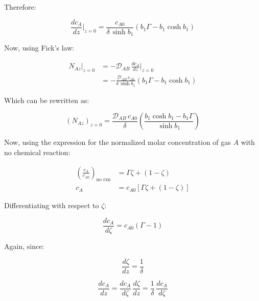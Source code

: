 \documentclass[letterpaper,12pt]{article}
\begin{document}
Therefore:

\begin{equation}
    \frac{dc_A}{dz}\bigg|_{z=0} = \frac{c_{A0}}{\delta\,\sinh b_1}\left(b_1\Gamma - b_1\cosh b_1\right)
\end{equation}

Now, using Fick's law:

\begin{equation}
\begin{aligned}
    N_{Az}\big|_{z=0} &= -\mathcal{D}_{AB}\,\frac{dc_A}{dz}\bigg|_{z=0} \\
                      &= -\frac{\mathcal{D}_{AB}\, c_{A0}}{\delta\,\sinh b_1}\left(b_1\Gamma - b_1\cosh b_1\right)
\end{aligned}
\end{equation}

Which can be rewritten as:

\begin{equation}
\boxed{
    \left( N_{Az} \right)_{z=0} = \frac{\mathcal{D}_{AB}\, c_{A0}}{\delta}\left(\frac{b_1\cosh b_1 - b_1\Gamma}{\sinh b_1}\right)
}
\end{equation}

Now, using the expression for the normalized molar concentration of gas $A$ with no chemical reaction:

\begin{equation}
\begin{aligned}
    \left(\frac{c_A}{c_{A0}}\right)_{\text{no rxn}} &= \Gamma\zeta + (1 - \zeta) \\
    c_A                                             &= c_{A0}\left[\Gamma\zeta + (1 - \zeta)\right]
\end{aligned}
\end{equation}

Differentiating with respect to $\zeta$:

\begin{equation}
    \frac{dc_A}{d\zeta} = c_{A0}\left(\Gamma - 1\right)
\end{equation}

Again, since:

\begin{equation}
    \frac{d\zeta}{dz} = \frac{1}{\delta}
\end{equation}

\begin{equation}
    \frac{dc_A}{dz} = \frac{dc_A}{d\zeta}\,\frac{d\zeta}{dz} = \frac{1}{\delta}\,\frac{dc_A}{d\zeta}
\end{equation}
\end{document}
